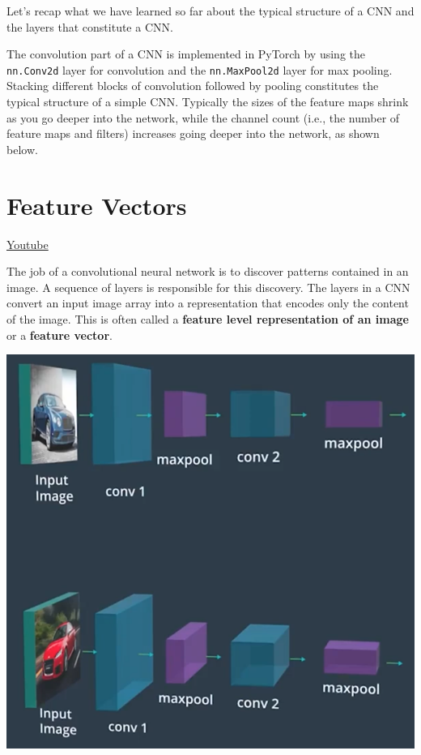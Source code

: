 Let's recap what we have learned so far about the typical structure of a CNN and the layers that constitute a CNN. \newline

The convolution part of a CNN is implemented in PyTorch by using the \lstinline{nn.Conv2d} layer for convolution and the \lstinline{nn.MaxPool2d} layer for max pooling. Stacking different blocks of convolution followed by pooling constitutes the typical structure of a simple CNN. Typically the sizes of the feature maps shrink as you go deeper into the network, while the channel count (i.e., the number of feature maps and filters) increases going deeper into the network, as shown below.


\section{Feature Vectors}
\href{https://www.youtube.com/watch?v=BzGasoPqzWY&t=1s&ab_channel=Udacity}{Youtube} \newline

The job of a convolutional neural network is to discover patterns contained in an image.
A sequence of layers is responsible for this discovery. The layers in a CNN convert an input image array into a representation that encodes only the content of the image. This is often called a \textbf{feature level representation of an image} or a \textbf{feature vector}. \newline

\includegraphics[width=1\linewidth]{img//cnn//depth/imagecar.png}

